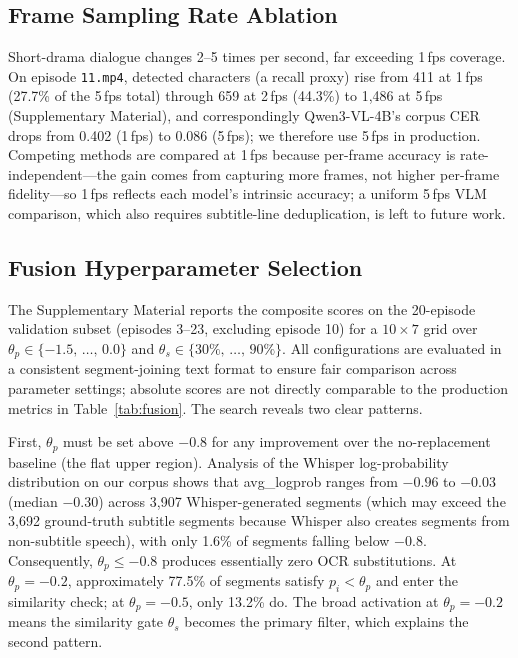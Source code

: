 \documentclass[journal]{IEEEtran}
\begin{document}
\subsection{Frame Sampling Rate Ablation}
\label{sec:fps_ablation}

Short-drama dialogue changes 2--5 times per second, far exceeding 1\,fps coverage.
On episode \texttt{11.mp4}, detected characters (a recall proxy) rise from 411 at 1\,fps (27.7\% of the 5\,fps total) through 659 at 2\,fps (44.3\%) to 1{,}486 at 5\,fps (Supplementary Material), and correspondingly Qwen3-VL-4B's corpus CER drops from 0.402 (1\,fps) to 0.086 (5\,fps); we therefore use 5\,fps in production.
Competing methods are compared at 1\,fps because per-frame accuracy is rate-independent---the gain comes from capturing more frames, not higher per-frame fidelity---so 1\,fps reflects each model's intrinsic accuracy; a uniform 5\,fps VLM comparison, which also requires subtitle-line deduplication, is left to future work.



\subsection{Fusion Hyperparameter Selection}
\label{sec:param_selection}



The Supplementary Material reports the composite scores on the 20-episode validation subset (episodes 3--23, excluding episode 10) for a $10 \times 7$ grid over $\theta_p \in \{-1.5,\,\dots,\,0.0\}$ and $\theta_s \in \{30\%,\,\dots,\,90\%\}$.
All configurations are evaluated in a consistent segment-joining text format to ensure fair comparison across parameter settings; absolute scores are not directly comparable to the production metrics in Table~\ref{tab:fusion}.
The search reveals two clear patterns.

First, $\theta_p$ must be set above $-0.8$ for any improvement over the no-replacement baseline (the flat upper region).
Analysis of the Whisper log-probability distribution on our corpus shows that avg\_logprob ranges from $-0.96$ to $-0.03$ (median $-0.30$) across 3,907 Whisper-generated segments (which may exceed the 3,692 ground-truth subtitle segments because Whisper also creates segments from non-subtitle speech), with only 1.6\% of segments falling below $-0.8$.
Consequently, $\theta_p \leq -0.8$ produces essentially zero OCR substitutions.
At $\theta_p = -0.2$, approximately 77.5\% of segments satisfy $p_i < \theta_p$ and enter the similarity check; at $\theta_p = -0.5$, only 13.2\% do.
The broad activation at $\theta_p = -0.2$ means the similarity gate $\theta_s$ becomes the primary filter, which explains the second pattern.
\end{document}
